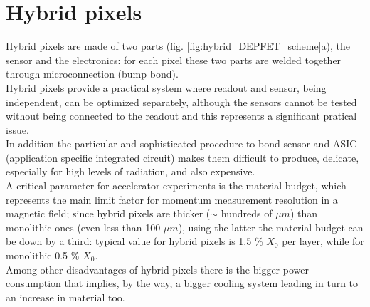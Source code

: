 \section{Hybrid pixels}
   Hybrid pixels are made of two parts (fig. \ref{fig:hybrid_DEPFET_scheme}a), the sensor and the electronics: for each pixel these two parts are welded together through microconnection (bump bond).\\  
   Hybrid pixels provide a practical system where readout and sensor, being independent, can be optimized separately, although the sensors cannot be tested without being connected to the readout and this represents a significant pratical issue.\\
   In addition the particular and sophisticated procedure to bond sensor and ASIC (application specific integrated circuit) makes them difficult to produce, delicate, especially for high levels of radiation, and also expensive. \\
   A critical parameter for accelerator experiments is the material budget, which represents the main limit factor for momentum measurement resolution in a magnetic field; since hybrid pixels are thicker ($\sim$ hundreds of $\mu m$) than monolithic ones (even less than 100 $\mu m$), using the latter the material budget can be down by a third: typical value for hybrid pixels is 1.5 \% $X_0$ per layer, while for monolithic 0.5 \% $X_0$.\\
   Among other disadvantages of hybrid pixels there is the bigger power consumption that implies, by the way, a bigger cooling system leading in turn to an increase in material too.\\

